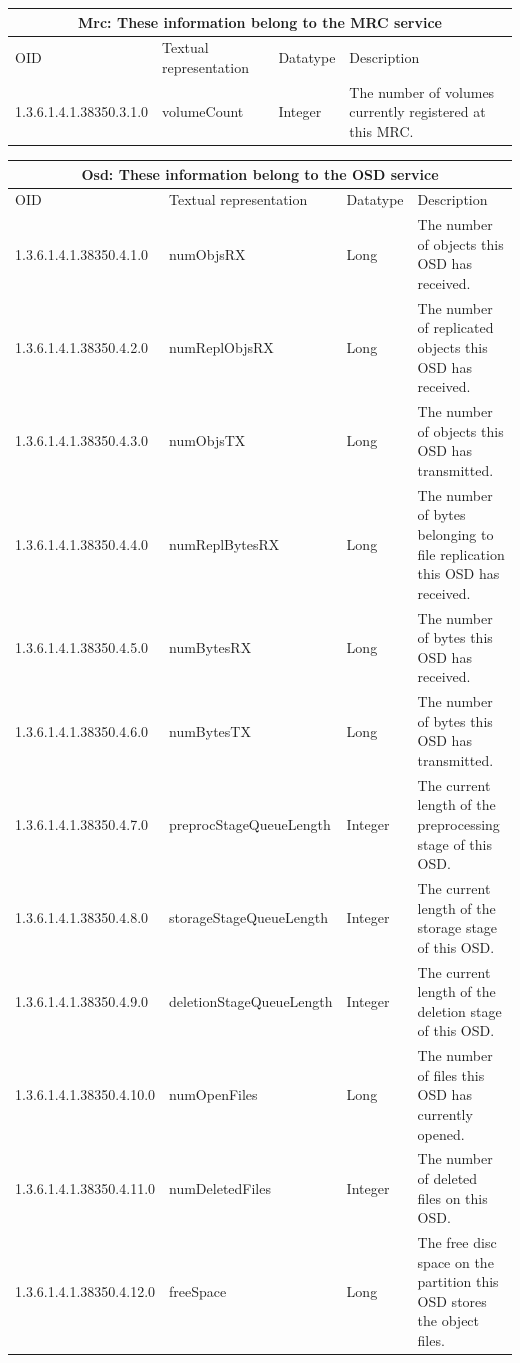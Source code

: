 \documentclass[a4paper,10pt]{book}
\begin{document}
\begin{tabular}{|l|l|l|p{5cm}|}
\hline
\multicolumn{4}{|c|}{Mrc: These information belong to the MRC service} \\
\hline
OID & Textual representation & Datatype & Description \\
\hline
1.3.6.1.4.1.38350.3.1.0 & volumeCount & Integer &  The number of volumes currently registered at this MRC.\\
\hline
\end{tabular}

\begin{tabular}{|l|l|l|p{5cm}|}
\hline
\multicolumn{4}{|c|}{Osd: These information belong to the OSD service} \\
\hline
OID & Textual representation & Datatype & Description \\
\hline
1.3.6.1.4.1.38350.4.1.0 & numObjsRX & Long &  The number of objects this OSD has received.\\
\hline
1.3.6.1.4.1.38350.4.2.0 & numReplObjsRX & Long & The number of replicated objects this OSD has received. \\
\hline
1.3.6.1.4.1.38350.4.3.0 & numObjsTX & Long & The number of objects this OSD has transmitted. \\
\hline
1.3.6.1.4.1.38350.4.4.0 & numReplBytesRX & Long &  The number of bytes belonging to file replication this OSD has received.\\
\hline
1.3.6.1.4.1.38350.4.5.0 & numBytesRX & Long & The number of bytes this OSD has received. \\
\hline
1.3.6.1.4.1.38350.4.6.0 & numBytesTX & Long &  The number of bytes this OSD has transmitted.\\
\hline
1.3.6.1.4.1.38350.4.7.0 & preprocStageQueueLength & Integer & The current length of the preprocessing stage of this OSD. \\
\hline
1.3.6.1.4.1.38350.4.8.0 & storageStageQueueLength & Integer &  The current length of the storage stage of this OSD.\\
\hline
1.3.6.1.4.1.38350.4.9.0 & deletionStageQueueLength & Integer & The current length of the deletion stage of this OSD. \\
\hline
1.3.6.1.4.1.38350.4.10.0 & numOpenFiles & Long & The number of files this OSD has currently opened.\\
\hline
1.3.6.1.4.1.38350.4.11.0 & numDeletedFiles & Integer & The number of deleted files on this OSD. \\
\hline
1.3.6.1.4.1.38350.4.12.0 & freeSpace & Long & The free disc space on the partition this OSD stores the object files.\\
\hline
\end{tabular}
\end{document}
